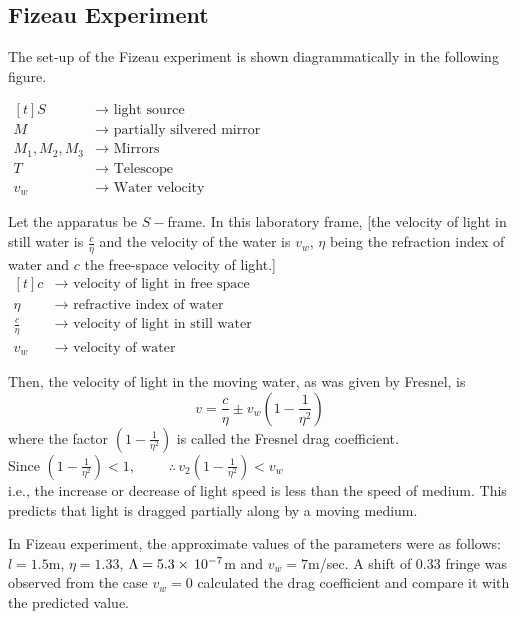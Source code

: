 \documentclass[../main-sheet.tex]{subfiles}
\begin{document}
\subsection{Fizeau Experiment}
The set-up of the Fizeau experiment is shown diagrammatically in the following figure.




\(\begin{aligned}[t]
    S&\to\text{ light source }\\
    M&\to\text{ partially silvered mirror }\\
    M_1,M_2,M_3&\to\text{ Mirrors }\\
    T&\to\text{ Telescope }\\
    v_w&\to\text{ Water velocity }
\end{aligned}\)


Let the apparatus be \(S-\)frame. In this laboratory frame, [the velocity of light in still water is \(\frac{c }{\eta}\) and the velocity of the water is \(v_w \), \(\eta\) being the refraction index of water and \(c \) the free-space velocity of light.]\\
\(\begin{aligned}[t]
    c&\to\text{ velocity of light in free space }\\
    \eta&\to\text{ refractive index of water }\\
    \frac{c }{\eta}&\to\text{ velocity of light in still water }\\
    v_w&\to\text{ velocity of water }
\end{aligned}\)


Then, the velocity of light in the moving water, as was given by Fresnel, is 
\begin{equation}
    v=\frac{c }{\eta}\pm v_w\left( 1-\frac{1}{\eta^2} \right)\label{eq:fiz1}
\end{equation}
where the factor \(\left( 1-\frac{1}{\eta^2} \right)\) is called the Fresnel drag coefficient.\\
Since \(\left( 1-\frac{1}{\eta^2} \right)<1,\qquad\) \(\therefore\, v_2\left( 1-\frac{1}{\eta^2} \right)<v_w\)\\
i.e., the increase or decrease of light speed is less than the speed of medium. This predicts that light is dragged partially along by a moving medium.


In Fizeau experiment, the approximate values of the parameters were as follows: \(l=1.5\)m, \(\eta=1.33\), \(\Lambda=5.3\times\,10^{-7}\)m and \(v_w=7\)m/sec. A shift of 0.33 fringe was observed from the case \(v_w=0\) calculated the drag coefficient and compare it with the predicted value.\\
\end{document}
